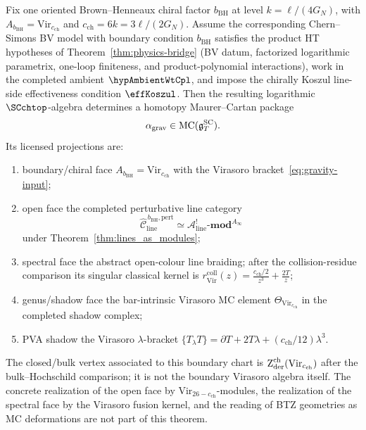 \begin{theorem}
\label{thm:gravity-mc}
Fix one oriented Brown--Henneaux chiral factor
\(b_{\mathrm{BH}}\) at level \(k=\ell/(4G_N)\), with
\(A_{b_{\mathrm{BH}}}=\mathrm{Vir}_{c_{\mathrm{ch}}}\) and
\(c_{\mathrm{ch}}=6k=3\ell/(2G_N)\).  Assume the corresponding
Chern--Simons BV model with boundary condition \(b_{\mathrm{BH}}\)
satisfies the product HT hypotheses of
Theorem~\ref{thm:physics-bridge} \textup{(}BV datum, factorized
logarithmic parametrix, one-loop finiteness, and product-polynomial
interactions\textup{)}, work in the completed ambient
\(\hypAmbientWtCpl\), and impose the chirally Koszul line-side
effectiveness condition \(\effKoszul\).  Then the resulting logarithmic
\(\SCchtop\)-algebra determines a homotopy Maurer--Cartan package
\[
\alpha_{\mathrm{grav}}\in\operatorname{MC}(\mathfrak{g}^{\mathrm{SC}}_T).
\]
Its licensed projections are:
\begin{enumerate}[label=\textup{(\roman*)}]
\item boundary/chiral face
 \(A_{b_{\mathrm{BH}}}=\mathrm{Vir}_{c_{\mathrm{ch}}}\) with
 the Virasoro bracket~\eqref{eq:gravity-input};
\item open face the completed perturbative line category
 \[
 \widehat{\mathcal C}^{\,b_{\mathrm{BH}},\mathrm{pert}}_{\mathrm{line}}
 \simeq
 \mathcal A^{!}_{\mathrm{line}}\text{-}\mathbf{mod}^{A_\infty}
 \]
 under Theorem~\ref{thm:lines_as_modules};
\item spectral face the abstract open-colour line braiding; after the
 collision-residue comparison its singular classical kernel is
 \(r^{\mathrm{coll}}_{\mathrm{Vir}}(z)=\frac{c_{\mathrm{ch}}/2}{z^3}
 +\frac{2T}{z}\);
\item genus/shadow face the bar-intrinsic Virasoro MC element
 \(\Theta_{\mathrm{Vir}_{c_{\mathrm{ch}}}}\) in the completed
 shadow complex;
\item PVA shadow the Virasoro \(\lambda\)-bracket
 \(\{T_\lambda T\}=\partial T+2T\lambda+(c_{\mathrm{ch}}/12)\lambda^3\).
\end{enumerate}
The closed/bulk vertex associated to this boundary chart is
\(\operatorname{Z}_{\mathrm{der}}^{\mathrm{ch}}(\mathrm{Vir}_{c_{\mathrm{ch}}})\) after the
bulk--Hochschild comparison; it is not the boundary Virasoro algebra
itself.  The concrete realization of the open face by
\(\mathrm{Vir}_{26-c_{\mathrm{ch}}}\)-modules, the realization of the
spectral face by the Virasoro fusion kernel, and the reading of BTZ
geometries as MC deformations are not part of this theorem.
\end{theorem}

